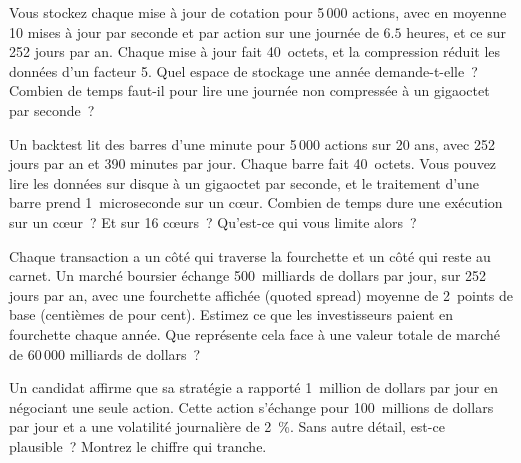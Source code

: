 \begin{question}\label{iq:iv1:estimation:15}
Vous stockez chaque mise à jour de cotation pour 5\,000 actions, avec en moyenne 10 mises à jour par seconde et par action sur une journée de $6.5$ heures, et ce sur 252 jours par an. Chaque mise à jour fait 40~octets, et la compression réduit les données d'un facteur 5. Quel espace de stockage une année demande-t-elle~? Combien de temps faut-il pour lire une journée non compressée à un gigaoctet par seconde~?
\end{question}

\begin{question}\label{iq:iv1:estimation:16}
Un backtest lit des barres d'une minute pour 5\,000 actions sur 20 ans, avec 252 jours par an et 390 minutes par jour. Chaque barre fait 40~octets. Vous pouvez lire les données sur disque à un gigaoctet par seconde, et le traitement d'une barre prend 1~microseconde sur un cœur. Combien de temps dure une exécution sur un cœur~? Et sur 16 cœurs~? Qu'est-ce qui vous limite alors~?
\end{question}

\begin{question}\label{iq:iv1:estimation:17}
Chaque transaction a un côté qui traverse la fourchette et un côté qui reste au carnet. Un marché boursier échange 500~milliards de dollars par jour, sur 252 jours par an, avec une fourchette affichée (quoted spread) moyenne de 2~points de base (centièmes de pour cent). Estimez ce que les investisseurs paient en fourchette chaque année. Que représente cela face à une valeur totale de marché de 60\,000 milliards de dollars~?
\end{question}

\begin{question}\label{iq:iv1:estimation:18}
Un candidat affirme que sa stratégie a rapporté 1~million de dollars par jour en négociant une seule action. Cette action s'échange pour 100~millions de dollars par jour et a une volatilité journalière de 2~\%. Sans autre détail, est-ce plausible~? Montrez le chiffre qui tranche.
\end{question}

